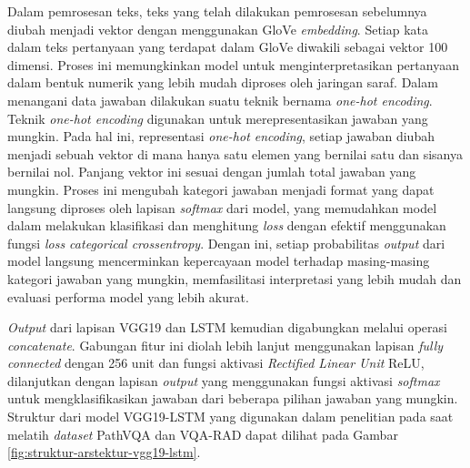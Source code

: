 \par Dalam pemrosesan teks, teks yang telah dilakukan pemrosesan sebelumnya diubah menjadi vektor dengan menggunakan GloVe \textit{embedding}. Setiap kata dalam teks pertanyaan yang terdapat dalam GloVe diwakili sebagai vektor 100 dimensi. Proses ini memungkinkan model untuk menginterpretasikan pertanyaan dalam bentuk numerik yang lebih mudah diproses oleh jaringan saraf. Dalam menangani data jawaban dilakukan suatu teknik bernama \textit{one-hot encoding}. Teknik \textit{one-hot encoding} digunakan untuk merepresentasikan jawaban yang mungkin. Pada hal ini, representasi \textit{one-hot encoding}, setiap jawaban diubah menjadi sebuah vektor di mana hanya satu elemen yang bernilai satu dan sisanya bernilai nol. Panjang vektor ini sesuai dengan jumlah total jawaban yang mungkin. Proses ini mengubah kategori jawaban menjadi format yang dapat langsung diproses oleh lapisan \textit{softmax} dari model, yang memudahkan model dalam melakukan klasifikasi dan menghitung \textit{loss} dengan efektif menggunakan fungsi \textit{loss categorical crossentropy}. Dengan ini, setiap probabilitas \textit{output} dari model langsung mencerminkan kepercayaan model terhadap masing-masing kategori jawaban yang mungkin, memfasilitasi interpretasi yang lebih mudah dan evaluasi performa model yang lebih akurat.

\par \textit{Output} dari lapisan VGG19 dan LSTM kemudian digabungkan melalui operasi \textit{concatenate}. Gabungan fitur ini diolah lebih lanjut menggunakan lapisan \textit{fully connected} dengan 256 unit dan fungsi aktivasi \textit{Rectified Linear Unit} ReLU, dilanjutkan dengan lapisan \textit{output} yang menggunakan fungsi aktivasi \textit{softmax} untuk mengklasifikasikan jawaban dari beberapa pilihan jawaban yang mungkin. Struktur dari model VGG19-LSTM yang digunakan dalam penelitian pada saat melatih \textit{dataset} PathVQA dan VQA-RAD dapat dilihat pada Gambar \ref{fig:struktur-arstektur-vgg19-lstm}.

